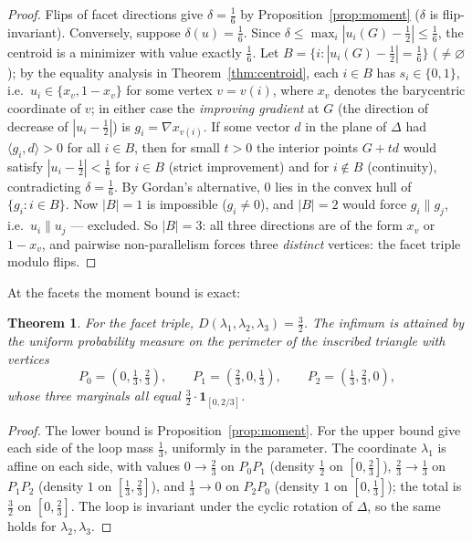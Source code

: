 \documentclass[11pt,reqno]{amsart}
\theoremstyle{plain}
\newtheorem{theorem}{Theorem}[section]
\theoremstyle{definition}
\theoremstyle{remark}
\begin{document}
\begin{proof}
Flips of facet directions give $\delta=\tfrac16$ by
Proposition~\ref{prop:moment} ($\delta$ is flip-invariant). Conversely,
suppose $\delta(u)=\tfrac16$. Since
$\delta\le\max_i|u_i(G)-\tfrac12|\le\tfrac16$, the centroid is a minimizer
with value exactly $\tfrac16$. Let $B=\{i:|u_i(G)-\tfrac12|=\tfrac16\}$
($\ne\varnothing$); by the equality analysis in
Theorem~\ref{thm:centroid}, each $i\in B$ has $s_i\in\{0,1\}$, i.e.\
$u_i\in\{x_{v},1-x_{v}\}$ for some vertex $v=v(i)$, where $x_v$ denotes the
barycentric coordinate of $v$; in either case the \emph{improving gradient}
at $G$ (the direction of decrease of $|u_i-\tfrac12|$) is
$g_i=\nabla x_{v(i)}$. If some vector $d$ in the plane of $\Delta$ had
$\langle g_i,d\rangle>0$ for all $i\in B$, then for small $t>0$ the interior
points $G+td$ would satisfy $|u_i-\tfrac12|<\tfrac16$ for $i\in B$ (strict
improvement) and for $i\notin B$ (continuity), contradicting
$\delta=\tfrac16$. By Gordan's alternative, $0$ lies in the convex hull of
$\{g_i:i\in B\}$. Now $|B|=1$ is impossible ($g_i\ne0$), and $|B|=2$ would
force $g_i\parallel g_j$, i.e.\ $u_i\parallel u_j$ --- excluded. So $|B|=3$:
all three directions are of the form $x_v$ or $1-x_v$, and pairwise
non-parallelism forces three \emph{distinct} vertices: the facet triple
modulo flips.
\end{proof}

At the facets the moment bound is exact:

\begin{theorem}\label{thm:facetdefect}
For the facet triple, $D(\lambda_1,\lambda_2,\lambda_3)=\tfrac32$. The infimum
is attained by the uniform probability measure on the perimeter of the inscribed
triangle with vertices
\[
P_0=(0,\tfrac13,\tfrac23),\qquad P_1=(\tfrac23,0,\tfrac13),\qquad
P_2=(\tfrac13,\tfrac23,0),
\]
whose three marginals all equal $\tfrac32\cdot\mathbf 1_{[0,2/3]}$.
\end{theorem}

\begin{proof}
The lower bound is Proposition~\ref{prop:moment}. For the upper bound give each
side of the loop mass $\tfrac13$, uniformly in the parameter. The coordinate
$\lambda_1$ is affine on each side, with values $0\to\tfrac23$ on $P_0P_1$
(density $\tfrac12$ on $[0,\tfrac23]$), $\tfrac23\to\tfrac13$ on $P_1P_2$
(density $1$ on $[\tfrac13,\tfrac23]$), and $\tfrac13\to0$ on $P_2P_0$ (density
$1$ on $[0,\tfrac13]$); the total is $\tfrac32$ on $[0,\tfrac23]$. The loop is
invariant under the cyclic rotation of $\Delta$, so the same holds for
$\lambda_2,\lambda_3$.
\end{proof}
\end{document}
